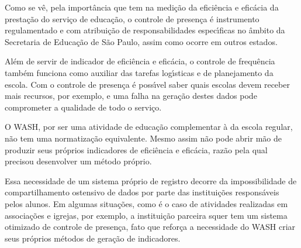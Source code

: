\documentclass[
12pt,		%
openright,	%
twoside,  %
a4paper,			%
chapter=TITLE,		%
english,			%
french,				%
spanish,			%
brazil				%
]{USPSC-classe/USPSC}
\begin{document}
Como se v\^e, pela import\^ancia que tem na medi\c{c}\~ao da efici\^encia e efic\'acia da presta\c{c}\~ao do servi\c{c}o de educa\c{c}\~ao, o controle de presen\c{c}a \'e instrumento regulamentado e com atribui\c{c}\~ao de responsabilidades espec\'{\i}ficas no \^ambito da Secretaria de Educa\c{c}\~ao de S\~ao Paulo, assim como ocorre em outros estados.














Al\'em de servir de indicador de efici\^encia e efic\'acia, o controle de frequ\^encia tamb\'em funciona como auxiliar das tarefas log\'{\i}sticas e de planejamento da escola. Com o controle de presen\c{c}a \'e poss\'{\i}vel saber quais escolas devem receber mais recursos, por exemplo, e uma falha na gera\c{c}\~ao destes dados pode comprometer a qualidade de todo o servi\c{c}o.














O WASH, por ser uma atividade de educa\c{c}\~ao complementar \`a da escola regular, n\~ao tem uma normatiza\c{c}\~ao equivalente. Mesmo assim n\~ao pode abrir m\~ao de produzir seus pr\'oprios indicadores de efici\^encia e efic\'acia, raz\~ao pela qual  precisou desenvolver um m\'etodo pr\'oprio.














Essa necessidade de um sistema pr\'oprio de registro decorre da impossibilidade de compartilhamento ostensivo de dados por parte das institui\c{c}\~oes respons\'aveis pelos alunos. Em algumas situa\c{c}\~oes, como \'e o caso de atividades realizadas em associa\c{c}\~oes e igrejas, por exemplo, a institui\c{c}\~ao parceira squer tem um sistema otimizado de controle de presen\c{c}a, fato que refor\c{c}a a necessidade do WASH criar seus pr\'oprios m\'etodos de gera\c{c}\~ao de indicadores.
\end{document}
